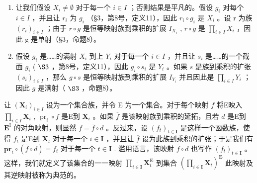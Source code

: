 \begin{enumerate}
\def\labelenumi{(\arabic{enumi})}
\item
  让我们假设 \(X_{i} \neq \emptyset\) 对于每一个 \(i \in I\) ；否则结果是平凡的。假设 \(g_{i}\) 对每个 \(i \in I\) ，并且让 \(r_{i}\) 为 \(g_{i}\) （§3，第8号，定义11），因此 \(r_{i} \circ g_{i}\) 是 \(X_{i}\) 。设 r 为族 \((r_{i})_{i \in I}\) ；由于 \(r \circ g\) 是恒等映射族到乘积的扩展 \(I_{X_{i}}\) , \(r \circ g\) 是 \(\prod_{i \in I} X_{i}\) ，因此 g 是单射（§3，命题8）。
\item
  假设 \(g_{i}\) 是……的满射 \(X_{i}\) 到上 \(Y_{i}\) 对于每一个 \(i \in I\) ，并且让 \(s_{i}\) 是……的一个截面 \(g_{i}\) ( \(\S 3\) ，第8号，定义11），因此 \(g_{i} \circ s_{i}\) 是 \(Y_{i}\) 。如果 \(s\) 是族到乘积的扩张 \((s_{i})_{i \in I}\) ，那么 \(g \circ s\) 是恒等映射族到乘积的扩展 \(I_{Y_{i}}\) 并且因此是 \(\prod_{i \in I} Y_{i}\) ；因此 \(g\) 是满射（ \(\S 3\) ，命题8）。
\end{enumerate}

让 \((\mathbf{X}_i)_{i\in I}\) 设为一个集合族，并令 E 为一个集合。对于每个映射 \(f\) 将E映入 \(\prod_{i\in I} \mathbf{X}_i\) , \(\operatorname{pr}_i \circ f\) 是E到 \(\mathbf{X}_i\) 。如果 \(\overline{f}\) 是该映射族到乘积的延拓，且若 \(d\) 是E到 \(\mathbf{E}^{\mathrm{I}}\) 的对角映射，则显然 \(f = \overline{f} \circ d\) 。反过来，设 \((f_{t})_{t \in \mathbf{I}}\) 是这样一个函数族，使得 \(f_{t}\) 是E到 \(\mathbf{X}_{t}\) 对于每一个 \(i \in \mathbf{I}\) ，并且让 \(\overline{f}\) 设为此族到乘积的扩张；于是我们有 \(\mathbf{pr}_{t} \circ (\overline{f} \circ d) = f_{t}\) 对于每一个 \(t \in \mathbf{I}\) . 滥用语言，该映射 \(\overline{f} \circ d\) 也写作 \((f_{t})_{t \in \mathbf{I}}\) 。这样，我们就定义了该集合的一一映射 \(\prod_{i \in \mathbf{I}} \mathbf{X}_{t}^{\mathbf{E}}\) 到集合 \(\left(\prod_{i \in \mathbf{I}} \mathbf{X}_{t}\right)^{\mathbf{E}}\) 此映射及其逆映射被称为典范的。

